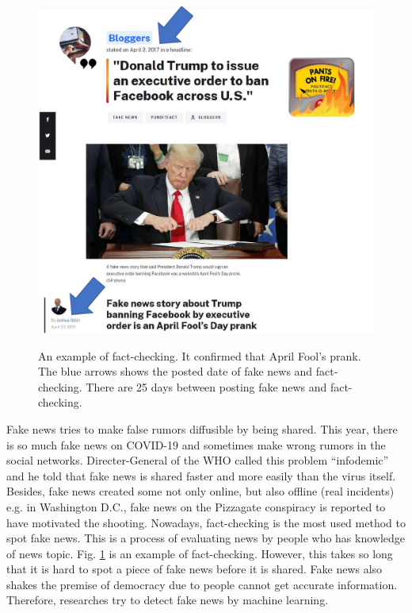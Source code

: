 \documentclass[conference]{IEEEtran}
\begin{document}
\begin{figure}[!t]
    \centering
    \includegraphics[width=\linewidth]{fact-check.pdf}
    \label{fig:example}
    \caption{
        An example of fact-checking. It confirmed that April Fool's prank.
        The blue arrows shows the posted date of fake news and fact-checking.
        There are 25 days between posting fake news and fact-checking.
    }
\end{figure}


Fake news tries to make false rumors diffusible by being shared.
This year, there is so much fake news on COVID-19 and sometimes make wrong rumors in the social networks.
Directer-General of the WHO called this problem ``infodemic'' and he told that fake news is shared faster and more easily than the virus itself\cite{ZAROCOSTAS2020676}. 
Besides, fake news created some not only online, but also offline (real incidents)
e.g. in Washington D.C., fake news on the Pizzagate conspiracy is reported to have motivated the shooting\cite{agencies_2016}.
Nowadays, fact-checking is the most used method to spot fake news.
This is a process of evaluating news by people who has knowledge of news topic.
Fig. \ref{fig:example} is an example of fact-checking\cite{gillin_2017}.
However, this takes so long that it is hard to spot a piece of fake news before it is shared.
Fake news also shakes the premise of democracy due to people cannot get accurate information.
Therefore, researches try to detect fake news by machine learning.
\end{document}
